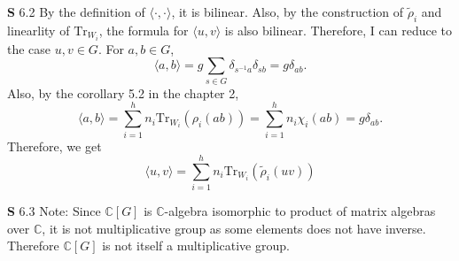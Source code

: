\documentclass[a4paper, 12pt]{article}
\theoremstyle{Mydefinition}
\theoremstyle{Mytheorem}
\begin{document}
\noindent \textbf{S} 6.2
By the definition of $\langle \cdot,\cdot\rangle$, it is bilinear. Also, by the construction of $\tilde{\rho}_i$ and linearlity of $\mathrm{Tr}_{W_i}$, the formula for $\langle u,v\rangle$ is also bilinear. Therefore, I can reduce to the case $u,v\in G$. For $a,b\in G$,
\begin{equation}
    \langle a, b\rangle = g\sum_{s\in G}\delta_{s^{-1}a}\delta_{sb} = g\delta_{ab}.
\end{equation}
Also, by the corollary 5.2 in the chapter 2, 
\begin{equation}
    \langle a, b\rangle = \sum_{i=1}^h n_i\mathrm{Tr}_{W_i}(\rho_i(ab)) = \sum_{i=1}^h n_i\chi_i(ab) = g\delta_{ab}.
\end{equation}
Therefore, we get
\begin{equation}
    \langle u,v\rangle = \sum_{i=1}^h n_i\mathrm{Tr}_{W_i}(\tilde{\rho}_i(uv))
\end{equation}

\noindent \textbf{S} 6.3
Note: Since $\mathbb{C}[G]$ is $\mathbb{C}$-algebra isomorphic to product of matrix algebras over $\mathbb{C}$, it is not multiplicative group as some elements does not have inverse. Therefore $\mathbb{C}[G]$ is not itself a multiplicative group.
\end{document}
